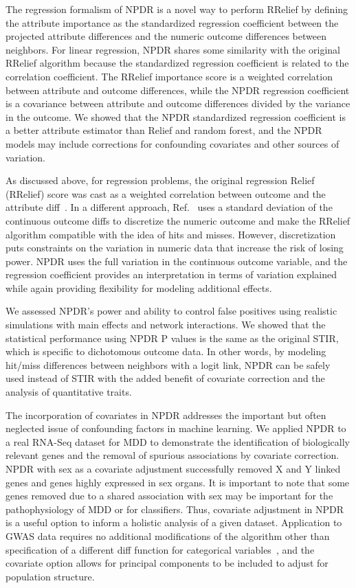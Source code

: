 \documentclass[10pt]{article}
\begin{document}
The regression formalism of NPDR is a novel way to perform RRelief by defining the attribute importance as the standardized regression coefficient between the projected attribute differences and the numeric outcome differences between neighbors.
For linear regression, NPDR shares some similarity with the original RRelief algorithm because the standardized regression coefficient is related to the correlation coefficient.
The RRelief importance score is a weighted correlation between attribute and outcome differences, while the NPDR regression coefficient is a covariance between attribute and outcome differences divided by the variance in the outcome.
We showed that the NPDR standardized regression coefficient is a better attribute estimator than Relief and random forest, and the NPDR models may include corrections for confounding covariates and other sources of variation. 

As discussed above, for regression problems, the original regression Relief (RRelief) score was cast as a weighted correlation between outcome and the attribute diff~\cite{robnik03}.
In a different approach, Ref.~\cite{urbanowicz17} uses a standard deviation of the continuous outcome diffs to discretize the numeric outcome and make the RRelief algorithm compatible with the idea of hits and misses.
However, discretization puts constraints on the variation in numeric data that increase the risk of losing power.
NPDR uses the full variation in the continuous outcome variable, and the regression coefficient provides an interpretation in terms of variation explained while again providing flexibility for modeling additional effects. 

We assessed NPDR's power and ability to control false positives using realistic simulations with main effects and network interactions.
We showed that the statistical performance using NPDR P values is the same as the original STIR, which is specific to dichotomous outcome data.
In other words, by modeling hit/miss differences between neighbors with a logit link, NPDR can be safely used instead of STIR with the added benefit of covariate correction and the analysis of quantitative traits.  

The incorporation of covariates in NPDR addresses the important but often neglected issue of confounding factors in machine learning. We applied NPDR to a real RNA-Seq dataset for MDD to demonstrate the identification of biologically relevant genes and the removal of spurious associations by covariate correction. NPDR with sex as a covariate adjustment successfully removed X and Y linked genes and genes highly expressed in sex organs. It is important to note that some genes removed due to a shared association with sex may be important for the pathophysiology of MDD or for classifiers.  Thus, covariate adjustment in NPDR is a useful option to inform a holistic analysis of a given dataset. Application to GWAS data requires no additional modifications of the algorithm other than specification of a different diff function for categorical variables~\cite{titv}, and the covariate option allows for principal components to be included to adjust for population structure. 
\end{document}
